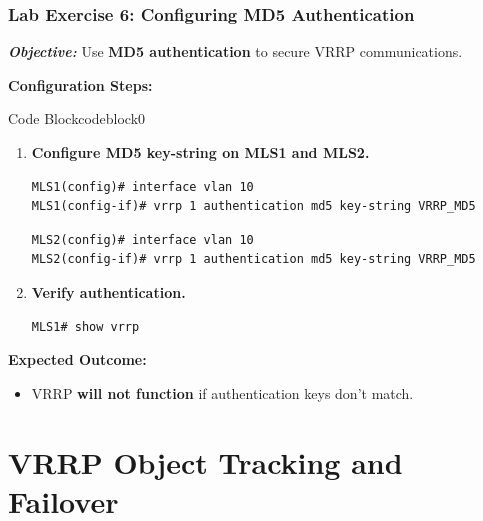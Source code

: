 \documentclass[a4paper]{book}
\begin{document}
\subsubsection{Lab Exercise 6: Configuring MD5 Authentication}
\textbf{\textit{Objective:}} Use \textbf{MD5 authentication} to secure VRRP communications.
\vspace{1.5em}

\textbf{Configuration Steps:}

\vspace{1.5em}


\begin{ocg}{Code Block}{codeblock}{0}

\vspace{0.5cm}
\begin{enumerate}
\item \textbf{Configure MD5 key-string on MLS1 and MLS2.}
\begin{lstlisting}
MLS1(config)# interface vlan 10
MLS1(config-if)# vrrp 1 authentication md5 key-string VRRP_MD5
\end{lstlisting}
\begin{lstlisting}
MLS2(config)# interface vlan 10
MLS2(config-if)# vrrp 1 authentication md5 key-string VRRP_MD5
\end{lstlisting}

\item \textbf{Verify authentication.}
\begin{lstlisting}
MLS1# show vrrp
\end{lstlisting}
\end{enumerate}
\end{ocg}




\textbf{Expected Outcome:}
\begin{itemize}
\item VRRP \textbf{will not function} if authentication keys don’t match.
\end{itemize}


\vspace{1.5em}

\section{VRRP Object Tracking and Failover}
\end{document}
